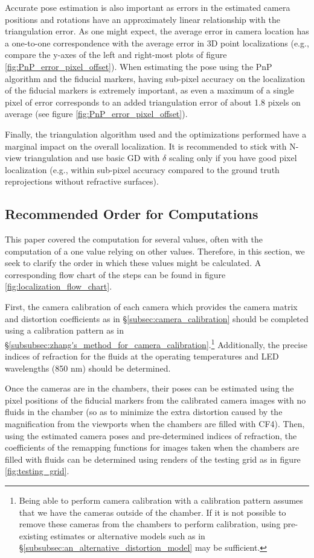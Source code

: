 \documentclass[11pt, letterpaper]{extarticle} %
\begin{document}
Accurate pose estimation is also important as errors in the estimated camera positions and rotations have an approximately linear relationship with the triangulation error. As one might expect, the average error in camera location has a one-to-one correspondence with the average error in 3D point localizations (e.g., compare the y-axes of the left and right-most plots of figure \ref{fig:PnP_error_pixel_offset}). When estimating the pose using the PnP algorithm and the fiducial markers, having sub-pixel accuracy on the localization of the fiducial markers is extremely important, as even a maximum of a single pixel of error corresponds to an added triangulation error of about 1.8 pixels on average (see figure \ref{fig:PnP_error_pixel_offset}).

Finally, the triangulation algorithm used and the optimizations performed have a marginal impact on the overall localization. It is recommended to stick with N-view triangulation and use basic GD with $\delta$ scaling only if you have good pixel localization (e.g., within sub-pixel accuracy compared to the ground truth reprojections without refractive surfaces).

\subsection{Recommended Order for Computations}
This paper covered the computation for several values, often with the computation of a one value relying on other values. Therefore, in this section, we seek to clarify the order in which these values might be calculated. A corresponding flow chart of the steps can be found in figure \ref{fig:localization_flow_chart}.

First, the camera calibration of each camera which provides the camera matrix and distortion coefficients as in \S\ref{subsec:camera_calibration} should be completed using a calibration pattern as in \S\ref{subsubsec:zhang's_method_for_camera_calibration}.\footnote{Being able to perform camera calibration with a calibration pattern assumes that we have the cameras outside of the chamber. If it is not possible to remove these cameras from the chambers to perform calibration, using pre-existing estimates or alternative models such as in \S\ref{subsubsec:an_alternative_distortion_model} may be sufficient.} Additionally, the precise indices of refraction for the fluids at the operating temperatures and LED wavelengths (850 nm) should be determined.

Once the cameras are in the chambers, their poses can be estimated using the pixel positions of the fiducial markers from the calibrated camera images with no fluids in the chamber (so as to minimize the extra distortion caused by the magnification from the viewports when the chambers are filled with CF4). Then, using the estimated camera poses and pre-determined indices of refraction, the coefficients of the remapping functions for images taken when the chambers are filled with fluids can be determined using renders of the testing grid as in figure \ref{fig:testing_grid}.
\end{document}
